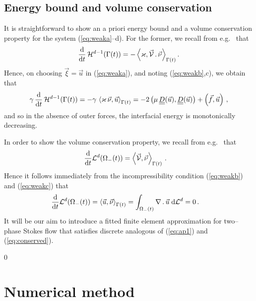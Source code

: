 \documentclass[a4paper,11pt,onecolumn]{article}
\newcommand{\vol}{\mathcal{L}^d}
\newcommand{\dL}[1]{\;{\rm d}{\cal L}^{#1}} %
\newcommand{\ddt}{\frac{\rm d}{{\rm d}t}}
\newcommand{\mat}[1]{\underline{\underline{#1}}\rule{0pt}{0pt}}
\begin{document}
\subsection{Energy bound and volume conservation}
It is straightforward to show an a priori energy bound and a volume
conservation property for the system (\ref{eq:weaka}--d). For the former, we
recall from e.g.\ \cite[Lemma~2.1]{DeckelnickDE05} that
\begin{equation}\label{eq:dtarea}
\ddt\,\mathcal{H}^{d-1}(\Gamma(t)) = -
\left\langle \varkappa,\vec{\mathcal{V}}\,.\,\vec\nu\right\rangle_{\Gamma(t)}.
\end{equation}
Hence, on choosing $\vec\xi = \vec u$ in (\ref{eq:weaka}), and noting
(\ref{eq:weakb},c), we obtain that
\begin{align}
\gamma\, \ddt\,\mathcal{H}^{d-1}(\Gamma(t)) = -
\gamma\,\left\langle \varkappa\,\vec\nu, \vec u\right\rangle_{\Gamma(t)}
=  - 2\left(\mu\,\mat D(\vec u), \mat D(\vec u)\right) +
\left(\vec f, \vec u\right) \,,
\label{eq:ap1}
\end{align}
and so in the absence of outer forces, the interfacial energy is monotonically
decreasing.

In order to show the volume conservation property, we recall from e.g.\
\cite[Lemma~2.1]{DeckelnickDE05} that
\begin{align}
\ddt \vol(\Omega_-(t)) & = \left\langle \vec{\mathcal{V}}, \vec\nu
\right\rangle_{\Gamma(t)}\,.
\end{align}
Hence it follows immediately from the incompressibility condition
(\ref{eq:weakb}) and (\ref{eq:weakc}) that
\begin{align}
\ddt \vol(\Omega_-(t)) & = \left\langle \vec u , \vec\nu
\right\rangle_{\Gamma(t)}
 = \int_{\Omega_-(t)} \nabla\,.\,\vec u \dL{d} =0\,. \label{eq:conserved}
\end{align}
It will be our aim to introduce a fitted finite element approximation for
two--phase Stokes flow that satisfies discrete analogous of
(\ref{eq:ap1}) and (\ref{eq:conserved}).

\setcounter{equation} 0
\section{Numerical method} \label{sec:3}
\end{document}
